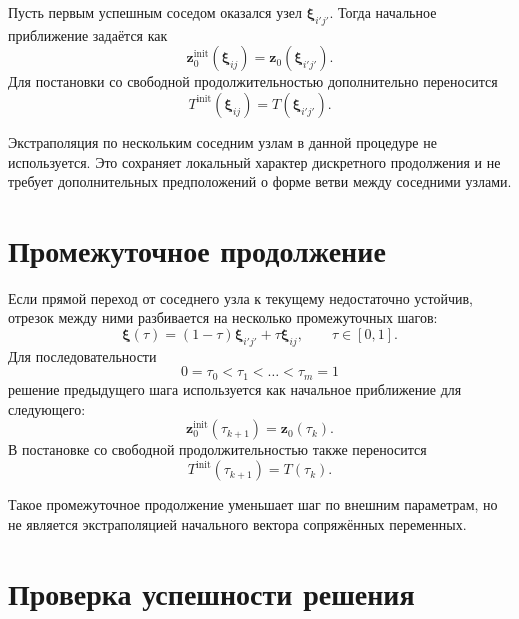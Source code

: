 Пусть первым успешным соседом оказался узел \(\boldsymbol\xi_{i'j'}\). Тогда начальное приближение задаётся как
\begin{equation}
	\mathbf z_0^{\mathrm{init}}(\boldsymbol\xi_{ij})
	=
	\mathbf z_0(\boldsymbol\xi_{i'j'}).
\end{equation}
Для постановки со свободной продолжительностью дополнительно переносится
\begin{equation}
	T^{\mathrm{init}}(\boldsymbol\xi_{ij})
	=
	T(\boldsymbol\xi_{i'j'}).
\end{equation}

Экстраполяция по нескольким соседним узлам в данной процедуре не используется. Это сохраняет локальный характер дискретного продолжения и не требует дополнительных предположений о форме ветви между соседними узлами.

\section*{Промежуточное продолжение}

Если прямой переход от соседнего узла к текущему недостаточно устойчив, отрезок между ними разбивается на несколько промежуточных шагов:
\begin{equation}
	\boldsymbol\xi(\tau)
	=
	(1-\tau)\boldsymbol\xi_{i'j'}
	+
	\tau\boldsymbol\xi_{ij},
	\qquad
	\tau\in[0,1].
\end{equation}
Для последовательности
\begin{equation}
	0=\tau_0<\tau_1<\ldots<\tau_m=1
\end{equation}
решение предыдущего шага используется как начальное приближение для следующего:
\begin{equation}
	\mathbf z_0^{\mathrm{init}}(\tau_{k+1})
	=
	\mathbf z_0(\tau_k).
\end{equation}
В постановке со свободной продолжительностью также переносится
\begin{equation}
	T^{\mathrm{init}}(\tau_{k+1})
	=
	T(\tau_k).
\end{equation}

Такое промежуточное продолжение уменьшает шаг по внешним параметрам, но не является экстраполяцией начального вектора сопряжённых переменных.

\section*{Проверка успешности решения}

